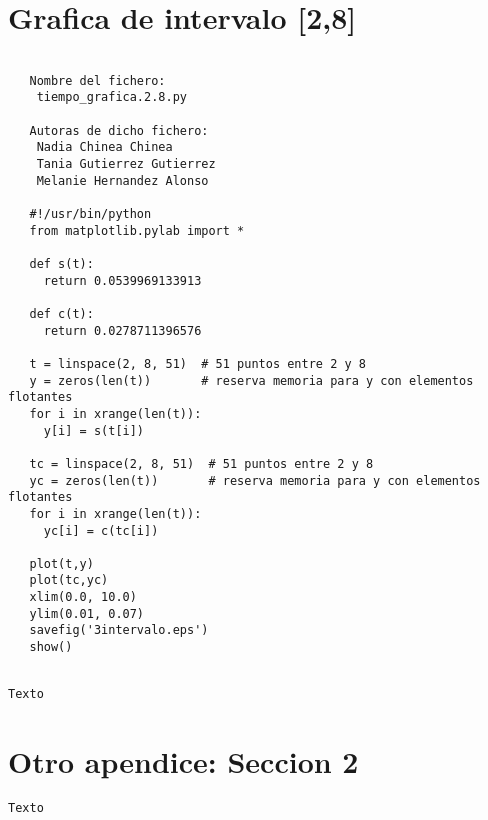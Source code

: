 \section{Grafica de intervalo [2,8]}
\label{sec7}
\begin{center}
\begin{footnotesize}
\begin{verbatim}
   
   Nombre del fichero:
    tiempo_grafica.2.8.py

   Autoras de dicho fichero:
    Nadia Chinea Chinea 
    Tania Gutierrez Gutierrez 
    Melanie Hernandez Alonso

   #!/usr/bin/python
   from matplotlib.pylab import *

   def s(t):
     return 0.0539969133913

   def c(t):
     return 0.0278711396576 

   t = linspace(2, 8, 51)  # 51 puntos entre 2 y 8
   y = zeros(len(t))       # reserva memoria para y con elementos flotantes
   for i in xrange(len(t)):
     y[i] = s(t[i])

   tc = linspace(2, 8, 51)  # 51 puntos entre 2 y 8
   yc = zeros(len(t))       # reserva memoria para y con elementos flotantes
   for i in xrange(len(t)):
     yc[i] = c(tc[i])

   plot(t,y)
   plot(tc,yc)
   xlim(0.0, 10.0)
   ylim(0.01, 0.07)
   savefig('3intervalo.eps')
   show()  
   
\end{verbatim}
\end{footnotesize}
\end{center}




\begin{center}
\begin{footnotesize}

\begin{verbatim}
Texto
\end{verbatim}

\end{footnotesize}
\end{center}

\section{Otro apendice: Seccion 2}
\label{Apendice2:label2}

\begin{center}
\begin{footnotesize}

\begin{verbatim}
Texto
\end{verbatim}


\end{footnotesize}
\end{center}
